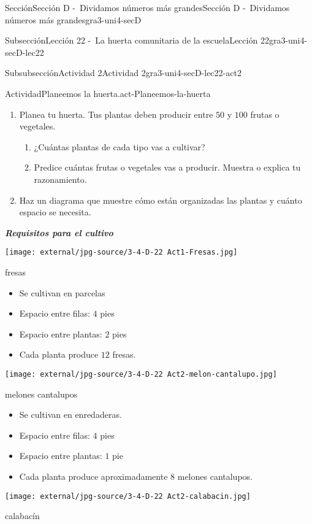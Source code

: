 \documentclass[twoside,10pt,]{article}
\newcommand{\alert}[1]{\textbf{\textit{#1}}}
\begin{document}
\begin{sectionptx}{Sección}{Sección D -~Dividamos números más grandes}{}{Sección D -~Dividamos números más grandes}{}{}{gra3-uni4-secD}
\begin{subsectionptx}{Subsección}{Lección 22 -~La huerta comunitaria de la escuela}{}{Lección 22}{}{}{gra3-uni4-secD-lec22}
\begin{subsubsectionptx}{Subsubsección}{Actividad 2}{}{Actividad 2}{}{}{gra3-uni4-secD-lec22-act2}
\begin{activity}{Actividad}{Planeemos la huerta.}{act-Planeemos-la-huerta}
\begin{enumerate}
\item{}Planea tu huerta. Tus plantas deben producir entre \(50\) y \(100\) frutas o vegetales.%
%
\begin{enumerate}
\item{}¿Cuántas plantas de cada tipo vas a cultivar?%
\item{}Predice cuántas frutas o vegetales vas a producir. Muestra o explica tu razonamiento.%
\end{enumerate}
\item{}Haz un diagrama que muestre cómo están organizadas las plantas y cuánto espacio se necesita.%
\end{enumerate}
\alert{Requisitos para el cultivo}%
\begin{sidebyside}{2}{0}{0}{0}%
\begin{sbspanel}{0.5}%
\texttt{[image: external/jpg-source/3-4-D-22 Act1-Fresas.jpg]}
%
\par
fresas%
%
\begin{itemize}[label=\textbullet]
\item{}Se cultivan en parcelas%
\item{}Espacio entre filas: \(4\) pies%
\item{}Espacio entre plantas: \(2\) pies%
\item{}Cada planta produce \(12\) fresas.%
\end{itemize}
\end{sbspanel}%
\begin{sbspanel}{0.5}%
\texttt{[image: external/jpg-source/3-4-D-22 Act2-melon-cantalupo.jpg]}
%
\par
melones cantalupos%
%
\begin{itemize}[label=\textbullet]
\item{}Se cultivan en enredaderas.%
\item{}Espacio entre filas: \(4\) pies%
\item{}Espacio entre plantas: \(1\) pie%
\item{}Cada planta produce aproximadamente \(8\) melones cantalupos.%
\end{itemize}
\end{sbspanel}%
\end{sidebyside}%
\begin{sidebyside}{2}{0}{0}{0}%
\begin{sbspanel}{0.5}%
\texttt{[image: external/jpg-source/3-4-D-22 Act2-calabacin.jpg]}
%
\par
calabacín%
%
\begin{itemize}[label=\textbullet]

\end{itemize}
\end{sbspanel}
\end{sidebyside}
\end{activity}
\end{subsubsectionptx}
\end{subsectionptx}
\end{sectionptx}
\end{document}

